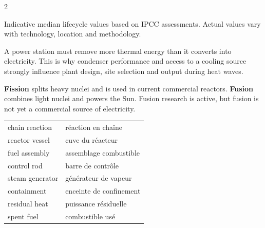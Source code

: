 \begin{multicols}{2}
\begin{tcolorbox}[title=\sffamily\bfseries Indicative lifecycle emissions,colback=white,colframe=ECBlue]
\centering
{}
{\scriptsize Indicative median lifecycle values based on IPCC assessments. Actual values vary with technology, location and methodology.}
\end{tcolorbox}

\begin{tcolorbox}[title=\sffamily\bfseries Engineering Insight,colback=white,colframe=ECOrange]
A power station must remove more thermal energy than it converts into electricity. This is why condenser performance and access to a cooling source strongly influence plant design, site selection and output during heat waves.
\end{tcolorbox}

\begin{tcolorbox}[title=\sffamily\bfseries Fission and fusion,colback=white,colframe=ECBlue]
\textbf{Fission} splits heavy nuclei and is used in current commercial reactors. \textbf{Fusion} combines light nuclei and powers the Sun. Fusion research is active, but fusion is not yet a commercial source of electricity.
\end{tcolorbox}

\begin{vocabulary}
\begin{tabularx}{\linewidth}{@{}lX@{}}
chain reaction & réaction en chaîne\\
reactor vessel & cuve du réacteur\\
fuel assembly & assemblage combustible\\
control rod & barre de contrôle\\
steam generator & générateur de vapeur\\
containment & enceinte de confinement\\
residual heat & puissance résiduelle\\
spent fuel & combustible usé
\end{tabularx}
\end{vocabulary}


\end{multicols}
